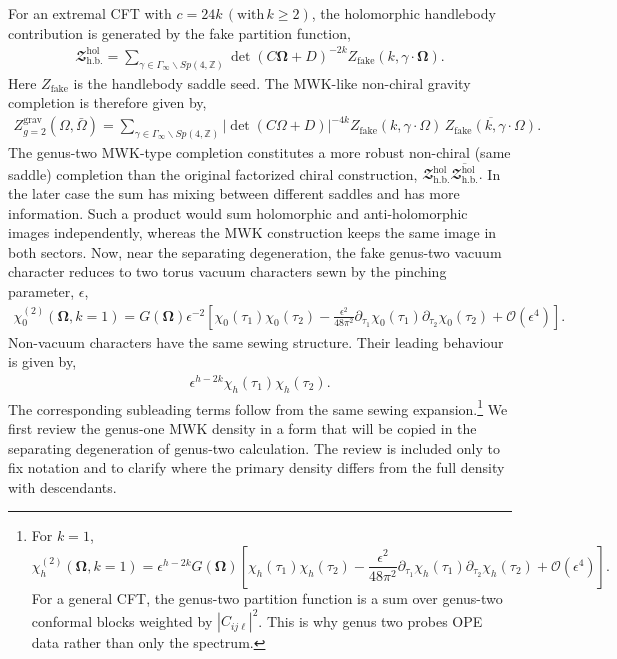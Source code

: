 \documentclass[12 pt]{article}
\begin{document}
For an extremal CFT with $c=24k \,(\text{with} \, k\geq2)$, the holomorphic handlebody contribution is generated by the fake partition function,
\begin{align}
    \mathbfcal{Z}^{\textrm{hol}}_{\textrm{h.b.}}
    =
    \sum_{\gamma\in\Gamma_\infty\backslash Sp(4,\mathbb{Z})}
    \det(C\mathbf{\Omega}+D)^{-2k}
    Z_{\textrm{fake}}(k,\gamma\cdot \mathbf{\Omega}) .
\end{align}
Here \(Z_{\textrm{fake}}\) is the handlebody saddle seed.  The MWK-like non-chiral gravity completion is therefore given by,
\begin{align}
    Z^{\textrm{grav}}_{g=2}(\Omega,\bar\Omega)
    =
    \sum_{\gamma\in\Gamma_\infty\backslash Sp(4,\mathbb{Z})}
    |\det(C\Omega+D)|^{-4k}
    Z_{\textrm{fake}}(k,\gamma\cdot\Omega)\,
    \overline{Z_{\textrm{fake}}(k,\gamma\cdot\Omega)} .
    \label{eq:section5-same-saddle}
\end{align}
The genus-two MWK-type completion constitutes a more robust non-chiral (same saddle) completion than the original factorized chiral construction,
$\mathbfcal{Z}_{\textrm{h.b.}}^{\textrm{hol}}
\overline{\mathbfcal{Z}_{\textrm{h.b.}}^{\textrm{hol}}}.$ In the later case the sum has mixing between different saddles and has more information. Such a product would sum holomorphic and anti-holomorphic images independently, whereas the MWK construction keeps the same image in both sectors. Now, near the separating degeneration, the fake genus-two vacuum character reduces to two torus vacuum characters sewn by the pinching parameter, \(\epsilon\),
\begin{align}
    \chi_{0}^{(2)}(\boldsymbol{\Omega},k=1)
    =
    G(\mathbf\Omega)\epsilon^{-2}
    \left[
    \chi_{0}(\tau_1)\chi_{0}(\tau_2)
    -
    \frac{\epsilon^2}{48\pi^2}
    \partial_{\tau_1}\chi_{0}(\tau_1)
    \partial_{\tau_2}\chi_{0}(\tau_2)
    +\mathcal{O}(\epsilon^4)
    \right].
\end{align}
Non-vacuum characters have the same sewing structure. Their leading behaviour is given by,
\begin{align*}
    \epsilon^{h-2k}\chi_h(\tau_1)\chi_h(\tau_2).
\end{align*}
The corresponding subleading terms follow from the same sewing expansion.\footnote{For \(k=1\),
\[
\chi_{h}^{(2)}(\boldsymbol{\Omega},k=1)
=
\epsilon^{h-2k}G(\boldsymbol{\Omega})
\left[
\chi_h(\tau_1)\chi_h(\tau_2)
-\frac{\epsilon^2}{48\pi^2}
\partial_{\tau_1}\chi_h(\tau_1)\partial_{\tau_2}\chi_h(\tau_2)
+\mathcal O(\epsilon^4)
\right].
\]
For a general CFT, the genus-two partition function is a sum over genus-two conformal blocks weighted by \(|C_{ij\ell}|^2\).  This is why genus two probes OPE data rather than only the spectrum.} We first review the genus-one MWK density in a form that will be copied in the separating degeneration of genus-two calculation.  The review is included only to fix notation and to clarify where the primary density differs from the full density with descendants.
\end{document}
